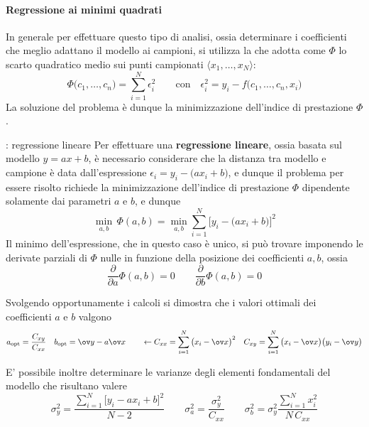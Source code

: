 	\paragraph{Regressione ai minimi quadrati} In generale per effettuare questo tipo di analisi, ossia determinare i coefficienti che meglio adattano il modello ai campioni, si utilizza la  che adotta come  $\Phi$ lo scarto quadratico medio sui punti campionati $\big\langle x_1, \dots, x_N\big\rangle$:
	\begin{equation}
		\Phi\big(c_1, \dots, c_n\big) = \sum_{i=1}^N \epsilon_i^2 \qquad \textrm{con} \quad \epsilon_i^2 = y_i- f\big(c_1, \dots, c_n, x_i\big)
	\end{equation}
	La soluzione del problema è dunque la minimizzazione dell'indice di prestazione $\Phi$.
	
	\begin{esempio}{: regressione lineare}
		Per effettuare una \textbf{regressione lineare}, ossia basata sul modello $y = ax + b$, è necessario considerare che la distanza tra modello e campione è data dall'espressione $\epsilon_i = y_i -\big(ax_i+b\big)$, e dunque il problema per essere risolto richiede la minimizzazione dell'indice di prestazione $\Phi$ dipendente solamente dai parametri $a$ e $b$, e dunque
		\[ \min_{a,b} \,\Phi(a,b) = \min_{a,b} \sum_{i=1}^N \Big[y_i - \big(ax_i+b\big)\Big]^2 \]
		Il minimo dell'espressione, che in questo caso è unico, si può trovare imponendo le derivate parziali di $\Phi$ nulle in funzione della posizione dei coefficienti $a,b$, ossia 
		\[ \frac \partial {\partial a} \Phi (a,b) = 0 \qquad  \frac \partial {\partial b} \Phi (a,b) = 0\]
		
		Svolgendo opportunamente i calcoli si dimostra che i valori ottimali dei coefficienti $a$ e $b$ valgono
		\[ a_\textrm{opt} = \frac{C_{xy}}{C_{xx}} \quad b_\textrm{opt} = \ov y - a\ov x \qquad \leftarrow  C_{xx} = \sum_{i=1}^N\big(x_i-\ov x\big)^2 \quad C_{xy} = \sum_{i=1}^N \big(x_i-\ov x\big)\big(y_i-\ov y\big) \]
		
		E' possibile inoltre determinare le varianze degli elementi fondamentali del modello che risultano valere
		\[ \sigma_y^2 = \frac{\sum_{i=1}^N \big[y_i-ax_i+b\big]^2}{N-2} \qquad \sigma_a^2 = \frac{\sigma_y^2}{C_{xx}} \qquad \sigma_b^2 = \sigma_y^2 \frac{\sum_{i=1}^N x_i^2}{N\, C_{xx}} \]
		
	\end{esempio}


